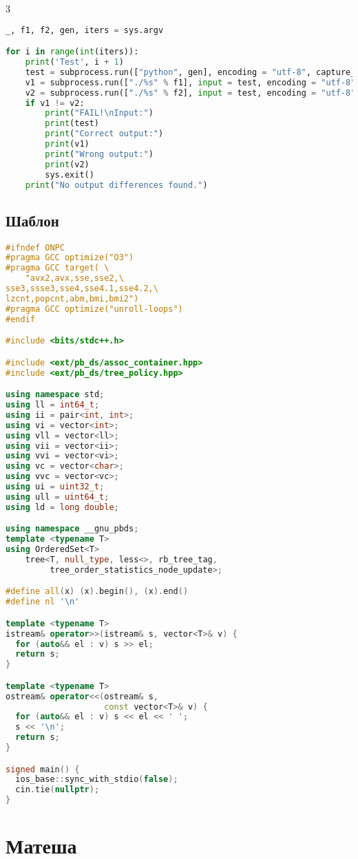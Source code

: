 \documentclass[10pt,a4paper,landscape,twosided]{extarticle}
\begin{document}
\begin{multicols}{3}
\begin{lstlisting}[language=Python]
_, f1, f2, gen, iters = sys.argv

for i in range(int(iters)):
    print('Test', i + 1)
    test = subprocess.run(["python", gen], encoding = "utf-8", capture_output = True).stdout
    v1 = subprocess.run(["./%s" % f1], input = test, encoding = "utf-8", capture_output = True).stdout
    v2 = subprocess.run(["./%s" % f2], input = test, encoding = "utf-8", capture_output = True).stdout
    if v1 != v2:
        print("FAIL!\nInput:")
        print(test)
        print("Correct output:")
        print(v1)
        print("Wrong output:")
        print(v2)
        sys.exit()
    print("No output differences found.")
\end{lstlisting}

\subsection{Шаблон}
\begin{lstlisting}[language=C++]
#ifndef ONPC
#pragma GCC optimize("O3")
#pragma GCC target( \
    "avx2,avx,sse,sse2,\
sse3,ssse3,sse4,sse4.1,sse4.2,\
lzcnt,popcnt,abm,bmi,bmi2")
#pragma GCC optimize("unroll-loops")
#endif

#include <bits/stdc++.h>

#include <ext/pb_ds/assoc_container.hpp>
#include <ext/pb_ds/tree_policy.hpp>

using namespace std;
using ll = int64_t;
using ii = pair<int, int>;
using vi = vector<int>;
using vll = vector<ll>;
using vii = vector<ii>;
using vvi = vector<vi>;
using vc = vector<char>;
using vvc = vector<vc>;
using ui = uint32_t;
using ull = uint64_t;
using ld = long double;

using namespace __gnu_pbds;
template <typename T>
using OrderedSet<T>
    tree<T, null_type, less<>, rb_tree_tag,
         tree_order_statistics_node_update>;

#define all(x) (x).begin(), (x).end()
#define nl '\n'

template <typename T>
istream& operator>>(istream& s, vector<T>& v) {
  for (auto&& el : v) s >> el;
  return s;
}

template <typename T>
ostream& operator<<(ostream& s,
                    const vector<T>& v) {
  for (auto&& el : v) s << el << ' ';
  s << '\n';
  return s;
}

signed main() {
  ios_base::sync_with_stdio(false);
  cin.tie(nullptr);
}
\end{lstlisting}

\section{Матеша}


\end{multicols}
\end{document}
